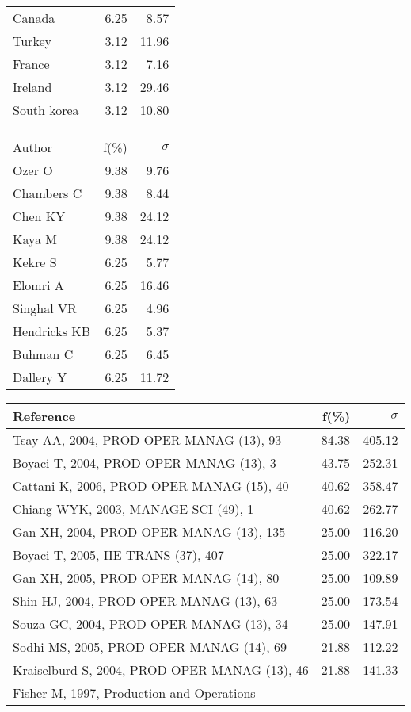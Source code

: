 \documentclass[a4paper,11pt]{report}
\begin{document}
\begin{landscape}
\begin{table}[!ht]
{\begin{tabular}{|l r r|}
Canada & 6.25 & 8.57\\
Turkey & 3.12 & 11.96\\
France & 3.12 & 7.16\\
Ireland & 3.12 & 29.46\\
South korea & 3.12 & 10.80\\
 &  & \\
 &  & \\
 &  & \\
\hline
\hline
Author & f(\%) & $\sigma$\\
\hline
Ozer O & 9.38 & 9.76\\
Chambers C & 9.38 & 8.44\\
Chen KY & 9.38 & 24.12\\
Kaya M & 9.38 & 24.12\\
Kekre S & 6.25 & 5.77\\
Elomri A & 6.25 & 16.46\\
Singhal VR & 6.25 & 4.96\\
Hendricks KB & 6.25 & 5.37\\
Buhman C & 6.25 & 6.45\\
Dallery Y & 6.25 & 11.72\\
\hline
\end{tabular}
}
{\scriptsize\begin{tabular}{|l r r|}
\hline
Reference & f(\%) & $\sigma$\\
\hline
Tsay AA, 2004, PROD OPER MANAG (13), 93 & 84.38 & 405.12\\
Boyaci T, 2004, PROD OPER MANAG (13), 3 & 43.75 & 252.31\\
Cattani K, 2006, PROD OPER MANAG (15), 40 & 40.62 & 358.47\\
Chiang WYK, 2003, MANAGE SCI (49), 1 & 40.62 & 262.77\\
Gan XH, 2004, PROD OPER MANAG (13), 135 & 25.00 & 116.20\\
Boyaci T, 2005, IIE TRANS (37), 407 & 25.00 & 322.17\\
Gan XH, 2005, PROD OPER MANAG (14), 80 & 25.00 & 109.89\\
Shin HJ, 2004, PROD OPER MANAG (13), 63 & 25.00 & 173.54\\
Souza GC, 2004, PROD OPER MANAG (13), 34 & 25.00 & 147.91\\
Sodhi MS, 2005, PROD OPER MANAG (14), 69 & 21.88 & 112.22\\
Kraiselburd S, 2004, PROD OPER MANAG (13), 46 & 21.88 & 141.33\\
Fisher M, 1997, Production and Operations &  & \\

\end{tabular}}
\end{table}
\end{landscape}
\end{document}

